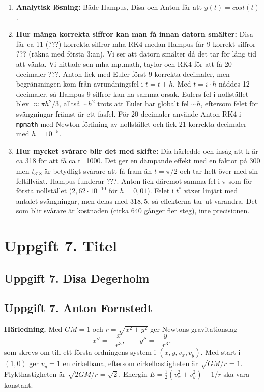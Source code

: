 \documentclass{article}
\begin{document}
\begin{enumerate}
    \item \textbf{Analytisk lösning:} Både Hampus, Disa och Anton får att $y(t)=cost(t)$.
    \item \textbf{Hur många korrekta siffror kan man få innan datorn smälter:} Disa får ca 11 (???) korrekta siffror mha RK4 medan Hampus får 9 korrekt siffror ??? (räkna med första 3:an). Vi ser att datorn smälter då det tar för lång tid att vänta. Vi hittade sen mha mp.math, taylor och RK4 för att få 20 decimaler ???. Anton fick med Euler först 9 korrekta decimaler, men begränsningen kom från
    avrundningsfel i $t = t + h$. Med $t = i \cdot h$ nåddes 12 decimaler, så Hampus
    9 siffror kan ha samma orsak. Eulers fel i nollstället blev $\approx \pi h^2/3$,
    alltså $\sim h^2$ trots att Euler har globalt fel $\sim h$, eftersom felet för
    svängningar främst är ett fasfel. För 20 decimaler använde Anton RK4 i
    \texttt{mpmath} med Newton-förfining av nollstället och fick 21 korrekta
    decimaler med $h = 10^{-5}$.
    \item \textbf{Hur mycket svårare blir det med skifte:} Dia härledde och insåg att k är ca 318 för att få ca t=1000. Det ger en dämpande effekt med en faktor på 300 men $t_{318}$ är betydligt svårare att få fram än $t=\pi/2$ och tar helt över med sin feltillväxt. Hampus funderar ???. Anton fick däremot samma fel i $\pi$ som för första nollstället
    ($2{,}62 \cdot 10^{-10}$ för $h = 0{,}01$). Felet i $t^*$ växer linjärt med antalet
    svängningar, men delas med $318{,}5$, så effekterna tar ut varandra. Det som
    blir svårare är kostnaden (cirka 640 gånger fler steg), inte precisionen.
\end{enumerate}

\section*{Uppgift 7. Titel}

\subsection*{Uppgift 7. Disa Degerholm}

\subsection*{Uppgift 7. Anton Fornstedt}

\textbf{Härledning.} Med $GM = 1$ och $r = \sqrt{x^2 + y^2}$ ger Newtons
gravitationslag
\[
  x'' = -\frac{x}{r^3}, \qquad y'' = -\frac{y}{r^3},
\]
som skrevs om till ett första ordningens system i $(x, y, v_x, v_y)$. Med start
i $(1, 0)$ ger $v_y = 1$ en cirkelbana, eftersom cirkelhastigheten är
$\sqrt{GM/r} = 1$. Flykthastigheten är $\sqrt{2GM/r} = \sqrt{2}$.
Energin $E = \tfrac{1}{2}(v_x^2 + v_y^2) - 1/r$ ska vara konstant. 
\end{document}
